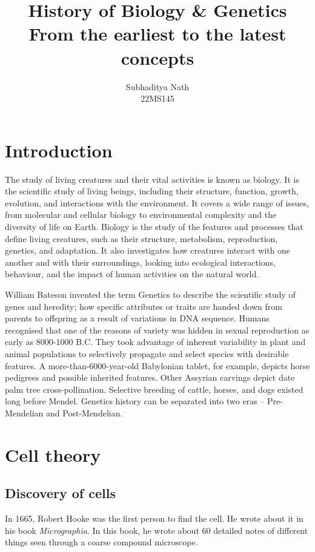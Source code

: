 \documentclass[12pt, a4paper, titlepage]{article}
\title{
    History of Biology \& Genetics \\
    \small From the earliest to the latest concepts
}
\author{Subhaditya Nath \\ 22MS145}
\date{\vskip 1em
    Spring 2023 \\
    \small LS1201
}
\begin{document}
\maketitle

\renewcommand*\contentsname{Summary}
\tableofcontents
\newpage
{}



\section{Introduction}
The study of living creatures and their vital activities is known as biology. It is the scientific study of living beings, including their structure, function, growth, evolution, and interactions with the environment. It covers a wide range of issues, from molecular and cellular biology to environmental complexity and the diversity of life on Earth. Biology is the study of the features and processes that define living creatures, such as their structure, metabolism, reproduction, genetics, and adaptation. It also investigates how creatures interact with one another and with their surroundings, looking into ecological interactions, behaviour, and the impact of human activities on the natural world.

William Bateson invented the term Genetics to describe the scientific study of genes and heredity; how specific attributes or traits are handed down from parents to offspring as a result of variations in DNA sequence. Humans recognised that one of the reasons of variety was hidden in sexual reproduction as early as 8000-1000 B.C. They took advantage of inherent variability in plant and animal populations to selectively propagate and select species with desirable features. A more-than-6000-year-old Babylonian tablet, for example, depicts horse pedigrees and possible inherited features. Other Assyrian carvings depict date palm tree cross-pollination. Selective breeding of cattle, horses, and dogs existed long before Mendel. Genetics history can be separated into two eras --  Pre-Mendelian and Post-Mendelian.


\section{Cell theory}
\subsection{Discovery of cells}
In 1665, Robert Hooke was the first person to find the cell. He wrote about it in his book \textit{Micrographia}. In this book, he wrote about 60 detailed notes of different things seen through a coarse compound microscope.
\end{document}

